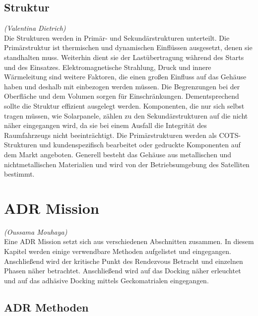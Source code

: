 		\subsection{Struktur}%
		\hfill\emph{(Valentina Dietrich)}\\
Die Strukturen werden in Primär- und Sekundärstrukturen unterteilt. Die Primärstruktur ist thermischen und dynamischen Einflüssen ausgesetzt, denen sie standhalten muss. Weiterhin dient sie der Lastübertragung während des Starts und des Einsatzes. Elektromagnetische Strahlung, Druck und innere Wärmeleitung sind weitere Faktoren, die einen großen Einfluss auf das Gehäuse haben und deshalb mit einbezogen werden müssen. Die Begrenzungen bei der Oberfläche und dem Volumen sorgen für Einschränkungen. Dementsprechend sollte die Struktur effizient ausgelegt werden. Komponenten, die nur sich selbst tragen müssen, wie Solarpanele, zählen zu den Sekundärstrukturen auf die nicht näher eingegangen wird, da sie bei einem Ausfall die Integrität des Raumfahrzeugs nicht beeinträchtigt. Die Primärstrukturen werden als COTS-Strukturen und kundenspezifisch bearbeitet oder gedruckte Komponenten auf dem Markt angeboten. Generell besteht das Gehäuse aus metallischen und nichtmetallischen Materialien und wird von der Betriebsumgebung des Satelliten bestimmt. \cite[S. 96 - 108]{NASA.Sota.2018} 

	\section{ADR Mission}
		\hfill\emph{(Oussama Mouhaya)}\\
Eine ADR Mission setzt sich aus verschiedenen Abschnitten zusammen. In diesem Kapitel werden einige verwendbare Methoden aufgelistet und eingegangen. Anschließend wird der kritische Punkt des Rendezvous Betracht und einzelnen Phasen näher betrachtet. Anschließend wird auf das Docking näher erleuchtet und auf das adhäsive Docking mittels Geckomatrialen  eingegangen. 
\subsection{ADR Methoden}
\label{ADRm}
	

